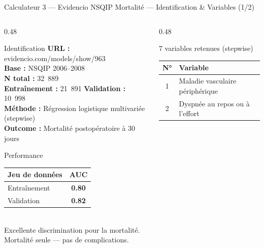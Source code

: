 \documentclass[aspectratio=169]{beamer}
\begin{document}
\begin{frame}{Calculateur 3 --- Evidencio NSQIP Mortalité --- Identification \& Variables (1/2)}
  \begin{columns}[T]
    \begin{column}{0.48\textwidth}
      \begin{block}{Identification}
        \footnotesize
        \textbf{URL :} evidencio.com/models/show/963\\[4pt]
        \textbf{Base :} NSQIP 2006--2008\\
        \textbf{N total :} 32~889\\
        \textbf{Entraînement :} 21~891 \quad \textbf{Validation :} 10~998\\[4pt]
        \textbf{Méthode :} Régression logistique multivariée (stepwise)\\[4pt]
        \textbf{Outcome :} Mortalité postopératoire à 30 jours
      \end{block}
      \vspace{0.4em}
      \begin{exampleblock}{Performance}
        \footnotesize
        \begin{tabular}{lc}
          \toprule
          \textbf{Jeu de données} & \textbf{AUC} \\
          \midrule
          Entraînement & \textbf{0.80} \\
          Validation    & \textbf{0.82} \\
          \bottomrule
        \end{tabular}\\[4pt]
        Excellente discrimination pour la mortalité.\\
        \textcolor{rougealerte}{Mortalité seule --- pas de complications.}
      \end{exampleblock}
    \end{column}
    \begin{column}{0.48\textwidth}
      \begin{block}{7 variables retenues (stepwise)}
        \footnotesize
        \begin{tabular}{cl}
          \toprule
          \textbf{N°} & \textbf{Variable} \\
          \midrule
          1 & Maladie vasculaire périphérique \\
          2 & Dyspnée au repos ou à l'effort \\

\end{tabular}
\end{block}
\end{column}
\end{columns}
\end{frame}
\end{document}
